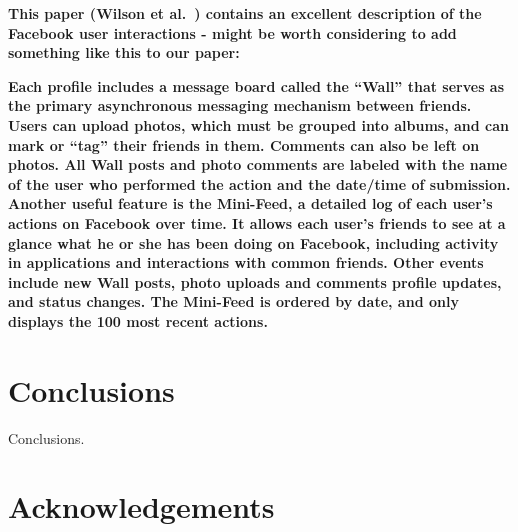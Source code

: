 \documentclass[letterpaper]{article}
\begin{document}


\textbf{This paper (Wilson et al.~\cite{wilson2009user}) contains an excellent description of the Facebook user interactions - might be worth considering to add something like this to our paper:}


\textbf{Each profile includes a message board called the “Wall” that serves as the primary asynchronous messaging mechanism between friends. Users can upload photos, which must be grouped into albums, and can mark or “tag” their friends in them. Comments can also be left on photos. All Wall posts and photo comments are labeled with the name of the user who performed the action and the date/time of submission. Another useful feature is the Mini-Feed, a detailed log of each user’s actions on Facebook over time. It allows each user’s friends to see at a glance what he or she has been doing on Facebook, including activity in applications and interactions with common friends. Other events include new Wall posts, photo uploads and comments profile updates, and status changes. The Mini-Feed is ordered by date, and only displays the 100 most recent actions.}


\section{Conclusions}


Conclusions.


\section{Acknowledgements}






\end{document}
